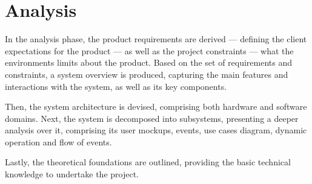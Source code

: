 \chapter{Analysis}
\label{ch:analysis}
In the analysis phase, the product requirements are derived --- defining the client expectations
for the product --- as well as the project constraints --- what the environments
limits about the product. Based on the set of requirements and constraints, a
system overview is produced, capturing the main features and interactions with
the system, as well as its key components.

Then, the system architecture is
devised, comprising both hardware and software domains. Next, the system is
decomposed into subsystems, presenting a deeper analysis over it, comprising its
user mockups, events, use cases diagram, dynamic operation and flow of events.

Lastly, the theoretical foundations are outlined,
providing the basic technical knowledge to undertake the project.
%




% 
% 
%
